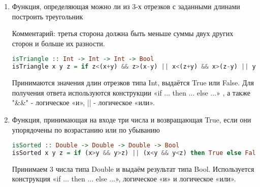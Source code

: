 \documentclass[14pt]{article}
\begin{document}
\begin{enumerate}
\item Функция, определяющая можно ли из 3-х отрезков с заданными длинами построить треугольник

Комментарий: третья сторона должна быть меньше суммы двух других сторон и больше их разности.
\begin{lstlisting}[language=haskell]
isTriangle :: Int -> Int -> Int -> Bool
isTriangle x y z = if z<(x+y) && z>(x-y) || x<(z+y) && x>(z-y) || y<(z+x) && y>(z-x) then True else False
\end{lstlisting}
Принимаются значения длин отрезков типа Int, выдаётся True или False. Для получения ответа используются конструкции «if ... then ... else ...» , а также "&&" - логическое «и», || - логическое «или».

\item Функция, принимающая на входе три числа и возвращающая True, если они упорядочены по возрастанию или по убыванию

\begin{lstlisting}[language=haskell]
isSorted :: Double -> Double -> Double -> Bool
isSorted x y z = if (x>y && y>z) || (x<y && y<z) then True else False
\end{lstlisting}
Принимаем 3 числа типа Double и выдаём результат типа Bool. Используется конструкция «if ... then ... else ...», логическое «и» и логическое «или». 

\end{enumerate}
\end{document}
